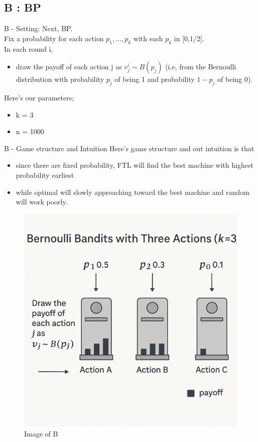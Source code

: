 \documentclass{beamer}
\begin{document}
\subsection{B : BP}

\begin{frame}{B - Setting:}
    Next, BP.\\
    Fix a probability for each action $p_{1},...,p_{k}$ with each $p_{k}$ in [0,1/2].\\
    In each round i,
    \begin{itemize}
        \item draw the payoff of each action j as $v^{i}_{j} \sim B(p_{j})$ (i.e, from the Bernoulli distribution with probability $p_j$ of being 1 and probability $1-p_{j}$ of being 0).
    \end{itemize}
    \vspace{1em}
    Here's our parameters;
    \begin{itemize}
        \item k = 3
        \item n = 1000
    \end{itemize}
\end{frame}

\begin{frame}{B - Game structure and Intuition}
    Here's game structure and out intuition is that 
    \begin{itemize}
        \item since there are fixed probability, FTL will find the best machine with highest probability earliest
        \item while optimal will slowly approaching toward the best machine and random will work poorly.
    \end{itemize}
    \begin{figure}
        \centering
        \includegraphics[width=0.4\linewidth]{332Project2//figures/Image_B.png}
        \caption{Image of B}
        \label{fig:placeholder}
    \end{figure}
\end{frame}
\end{document}

